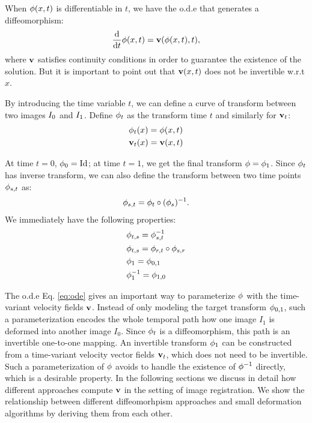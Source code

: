 \documentclass[letterpaper,12pt]{article}
\begin{document}
When $\phi(x, t)$ is differentiable in $t$, we have the o.d.e that generates a diffeomorphism:
\begin{align}
\frac{\text{d}}{\text{d} t} \phi(x, t) = \mathbf{v}(\phi(x, t), t), 
\label{eq:ode}
\end{align}
where $\mathbf{v}$ satisfies continuity conditions in order to guarantee the existence of the solution. But it is important to point out that $\mathbf{v}(x,t)$ does not be invertible w.r.t $x$.

By introducing the time variable $t$, we can define a curve of transform between two images $I_0$ and $I_1$. Define $\phi_t$ as the transform time $t$ and similarly for $\mathbf{v}_t$:
\begin{align}
& \phi_t(x) = \phi(x, t) \\
& \mathbf{v}_t(x) = \mathbf{v}(x, t) \\
\end{align}

At time $t=0$, $\phi_0 = \text{Id}$; at time $t=1$, we get the final transform $\phi = \phi_1$. Since $\phi_t$ has inverse transform, we can also define the transform between two time points $\phi_{s,t}$ as:
\begin{align}
\phi_{s,t} = \phi_t \circ (\phi_s)^{-1}.
\end{align}
We immediately have the following properties:
\begin{align}
& \phi_{t, s} = \phi_{s, t}^{-1} \\
& \phi_{t, s} = \phi_{r, t} \circ \phi_{s, r} \\
& \phi_1 = \phi_{0, 1} \\
& \phi_1^{-1} = \phi_{1, 0}
\label{eq:invphi}
\end{align}

The o.d.e Eq. \ref{eq:ode} gives an important way to parameterize $\phi$ with the time-variant velocity fields $\mathbf{v}$. Instead of only modeling the target transform $\phi_{0,1}$, such a parameterization encodes the whole temporal path how one image $I_1$ is deformed into another image $I_0$. Since $\phi_t$ is a diffeomorphism, this path is an invertible one-to-one mapping. An invertible transform $\phi_1$ can be constructed from a time-variant velocity vector fields $\mathbf{v}_t$, which does not need to be invertible. Such a parameterization of $\phi$ avoids to handle the existence of $\phi^{-1}$ directly, which is a desirable property. In the following sections we discuss in detail how different approaches compute $\mathbf{v}$ in the setting of image registration. We show the relationship between different diffeomorhpism approaches and small deformation algorithms by deriving them from each other.
\end{document}
